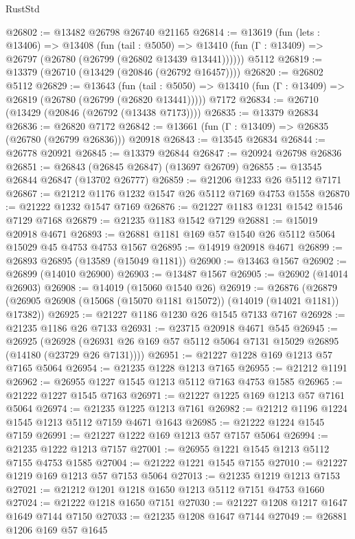 \begin{lexlean}{RustStd}
\begin{coremodule}
@26802 := @13482 @26798 @26740 @21165
@26814 := @13619
    (fun (lets : @13406) =>
    @13408
      (fun (tail : @5050) =>
      @13410 (fun (Γ : @13409) => @26797 (@26780 (@26799 (@26802 @13439 @13441))))))
    @5112
@26819 := @13379 (@26710 (@13429 (@20846 (@26792 @16457))))
@26820 := @26802 @5112
@26829 := @13643
    (fun (tail : @5050) => @13410 (fun (Γ : @13409) => @26819 (@26780 (@26799 (@26820 @13441)))))
    @7172
@26834 := @26710 (@13429 (@20846 (@26792 (@13438 @7173))))
@26835 := @13379 @26834
@26836 := @26820 @7172
@26842 := @13661 (fun (Γ : @13409) => @26835 (@26780 (@26799 @26836))) @20918
@26843 := @13545 @26834
@26844 := @26778 @20921
@26845 := @13379 @26844
@26847 := @20924 @26798 @26836
@26851 := @26843 (@26845 @26847) (@13697 @26709)
@26855 := @13545 @26844 @26847 (@13702 @26777)
@26859 := @21206 @1233 @26 @5112 @7171
@26867 := @21212 @1176 @1232 @1547 @26 @5112 @7169 @4753 @1558
@26870 := @21222 @1232 @1547 @7169
@26876 := @21227 @1183 @1231 @1542 @1546 @7129 @7168
@26879 := @21235 @1183 @1542 @7129
@26881 := @15019 @20918 @4671
@26893 := @26881 @1181 @169 @57 @1540 @26 @5112 @5064 @15029 @45 @4753 @4753 @1567
@26895 := @14919 @20918 @4671
@26899 := @26893 @26895 (@13589 (@15049 @1181))
@26900 := @13463 @1567
@26902 := @26899 (@14010 @26900)
@26903 := @13487 @1567
@26905 := @26902 (@14014 @26903)
@26908 := @14019 (@15060 @1540 @26)
@26919 := @26876
    (@26879 (@26905 @26908 (@15068 (@15070 @1181 @15072)) (@14019 (@14021 @1181)) @17382))
@26925 := @21227 @1186 @1230 @26 @1545 @7133 @7167
@26928 := @21235 @1186 @26 @7133
@26931 := @23715 @20918 @4671 @545
@26945 := @26925
    (@26928 (@26931 @26 @169 @57 @5112 @5064 @7131 @15029 @26895 (@14180 (@23729 @26 @7131))))
@26951 := @21227 @1228 @169 @1213 @57 @7165 @5064
@26954 := @21235 @1228 @1213 @7165
@26955 := @21212 @1191
@26962 := @26955 @1227 @1545 @1213 @5112 @7163 @4753 @1585
@26965 := @21222 @1227 @1545 @7163
@26971 := @21227 @1225 @169 @1213 @57 @7161 @5064
@26974 := @21235 @1225 @1213 @7161
@26982 := @21212 @1196 @1224 @1545 @1213 @5112 @7159 @4671 @1643
@26985 := @21222 @1224 @1545 @7159
@26991 := @21227 @1222 @169 @1213 @57 @7157 @5064
@26994 := @21235 @1222 @1213 @7157
@27001 := @26955 @1221 @1545 @1213 @5112 @7155 @4753 @1585
@27004 := @21222 @1221 @1545 @7155
@27010 := @21227 @1219 @169 @1213 @57 @7153 @5064
@27013 := @21235 @1219 @1213 @7153
@27021 := @21212 @1201 @1218 @1650 @1213 @5112 @7151 @4753 @1660
@27024 := @21222 @1218 @1650 @7151
@27030 := @21227 @1208 @1217 @1647 @1649 @7144 @7150
@27033 := @21235 @1208 @1647 @7144
@27049 := @26881
    @1206
    @169
    @57
    @1645

\end{coremodule}
\end{lexlean}
